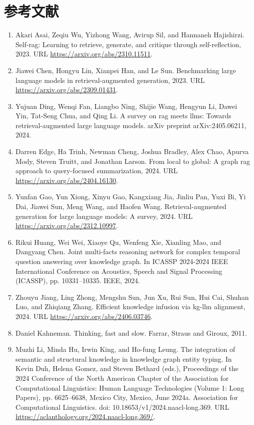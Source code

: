 \documentclass[11pt,UTF8,fontset=fandol]{ctexart}
\begin{document}
\section*{参考文献}
\begin{enumerate}[leftmargin=2em]
\item Akari Asai, Zeqiu Wu, Yizhong Wang, Avirup Sil, and Hannaneh Hajishirzi. Self-rag: Learning to retrieve, generate, and critique through self-reflection, 2023. URL \url{https://arxiv.org/abs/2310.11511}.
\item Jiawei Chen, Hongyu Lin, Xianpei Han, and Le Sun. Benchmarking large language models in retrieval-augmented generation, 2023. URL \url{https://arxiv.org/abs/2309.01431}.
\item Yujuan Ding, Wenqi Fan, Liangbo Ning, Shijie Wang, Hengyun Li, Dawei Yin, Tat-Seng Chua, and Qing Li. A survey on rag meets llms: Towards retrieval-augmented large language models. arXiv preprint arXiv:2405.06211, 2024.
\item Darren Edge, Ha Trinh, Newman Cheng, Joshua Bradley, Alex Chao, Apurva Mody, Steven Truitt, and Jonathan Larson. From local to global: A graph rag approach to query-focused summarization, 2024. URL \url{https://arxiv.org/abs/2404.16130}.
\item Yunfan Gao, Yun Xiong, Xinyu Gao, Kangxiang Jia, Jinliu Pan, Yuxi Bi, Yi Dai, Jiawei Sun, Meng Wang, and Haofen Wang. Retrieval-augmented generation for large language models: A survey, 2024. URL \url{https://arxiv.org/abs/2312.10997}.
\item Rikui Huang, Wei Wei, Xiaoye Qu, Wenfeng Xie, Xianling Mao, and Dangyang Chen. Joint multi-facts reasoning network for complex temporal question answering over knowledge graph. In ICASSP 2024-2024 IEEE International Conference on Acoustics, Speech and Signal Processing (ICASSP), pp. 10331--10335. IEEE, 2024.
\item Zhouyu Jiang, Ling Zhong, Mengshu Sun, Jun Xu, Rui Sun, Hui Cai, Shuhan Luo, and Zhiqiang Zhang. Efficient knowledge infusion via kg-llm alignment, 2024. URL \url{https://arxiv.org/abs/2406.03746}.
\item Daniel Kahneman. Thinking, fast and slow. Farrar, Straus and Giroux, 2011.
\item Muzhi Li, Minda Hu, Irwin King, and Ho-fung Leung. The integration of semantic and structural knowledge in knowledge graph entity typing. In Kevin Duh, Helena Gomez, and Steven Bethard (eds.), Proceedings of the 2024 Conference of the North American Chapter of the Association for Computational Linguistics: Human Language Technologies (Volume 1: Long Papers), pp. 6625--6638, Mexico City, Mexico, June 2024a. Association for Computational Linguistics. doi: 10.18653/v1/2024.naacl-long.369. URL \url{https://aclanthology.org/2024.naacl-long.369/}.

\end{enumerate}
\end{document}
